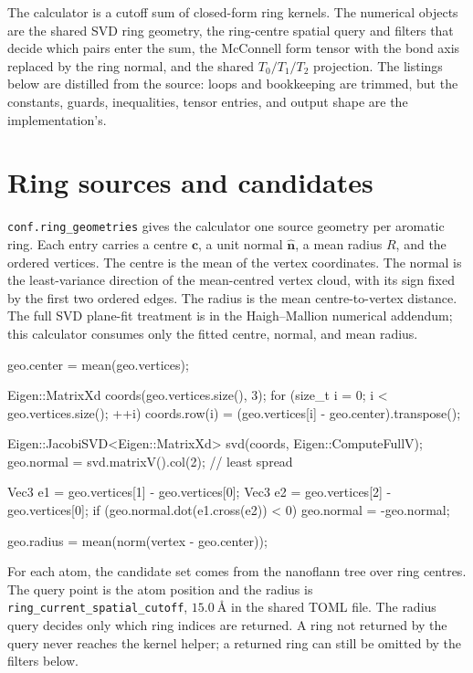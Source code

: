 \documentclass[11pt]{article}
\newcommand{\code}[1]{\texttt{#1}}
\begin{document}

The calculator is a cutoff sum of closed-form ring kernels. The numerical
objects are the shared SVD ring geometry, the ring-centre spatial query and
filters that decide which pairs enter the sum, the McConnell form tensor with
the bond axis replaced by the ring normal, and the shared \(T_0/T_1/T_2\)
projection. The listings below are distilled from the source: loops and
bookkeeping are trimmed, but the constants, guards, inequalities, tensor
entries, and output shape are the implementation's.

\section{Ring sources and candidates}

\code{conf.ring\_geometries} gives the calculator one source geometry per
aromatic ring. Each entry carries a centre \(\bm c\), a unit normal
\(\hat{\bm n}\), a mean radius \(R\), and the ordered vertices. The centre is
the mean of the vertex coordinates. The normal is the least-variance direction
of the mean-centred vertex cloud, with its sign fixed by the first two ordered
edges. The radius is the mean centre-to-vertex distance. The full SVD plane-fit
treatment is in the Haigh--Mallion numerical addendum; this calculator consumes
only the fitted centre, normal, and mean radius.

\begin{codebox}
geo.center = mean(geo.vertices);

Eigen::MatrixXd coords(geo.vertices.size(), 3);
for (size_t i = 0; i < geo.vertices.size(); ++i)
    coords.row(i) = (geo.vertices[i] - geo.center).transpose();

Eigen::JacobiSVD<Eigen::MatrixXd> svd(coords, Eigen::ComputeFullV);
geo.normal = svd.matrixV().col(2);       // least spread

Vec3 e1 = geo.vertices[1] - geo.vertices[0];
Vec3 e2 = geo.vertices[2] - geo.vertices[0];
if (geo.normal.dot(e1.cross(e2)) < 0) geo.normal = -geo.normal;

geo.radius = mean(norm(vertex - geo.center));
\end{codebox}

For each atom, the candidate set comes from the nanoflann tree over ring
centres. The query point is the atom position and the radius is
\code{ring\_current\_spatial\_cutoff}, \(\SI{15.0}{\angstrom}\) in the shared
TOML file. The radius query decides only which ring indices are returned. A
ring not returned by the query never reaches the kernel helper; a returned ring
can still be omitted by the filters below.
\end{document}
